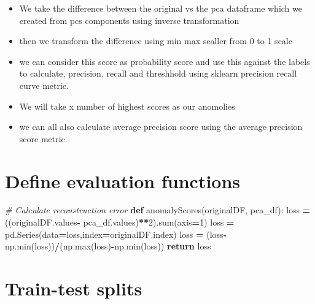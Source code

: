 \documentclass[
]{article}
\newenvironment{Shaded}{\begin{snugshade}}{\end{snugshade}}
\newcommand{\BuiltInTok}[1]{#1}
\newcommand{\CommentTok}[1]{\textcolor[rgb]{0.56,0.35,0.01}{\textit{#1}}}
\newcommand{\ControlFlowTok}[1]{\textcolor[rgb]{0.13,0.29,0.53}{\textbf{#1}}}
\newcommand{\DecValTok}[1]{\textcolor[rgb]{0.00,0.00,0.81}{#1}}
\newcommand{\KeywordTok}[1]{\textcolor[rgb]{0.13,0.29,0.53}{\textbf{#1}}}
\newcommand{\NormalTok}[1]{#1}
\newcommand{\OperatorTok}[1]{\textcolor[rgb]{0.81,0.36,0.00}{\textbf{#1}}}
\providecommand{\tightlist}{%
  \setlength{\itemsep}{0pt}\setlength{\parskip}{0pt}}
\begin{document}
\begin{itemize}
\tightlist
\item
  We take the difference between the original vs the pca dataframe which
  we created from pcs components using inverse transformation
\item
  then we transform the difference using min max scaller from 0 to 1
  scale
\item
  we can consider this score as probability score and use this against
  the labels to calculate, precision, recall and threshhold using
  sklearn precision recall curve metric.
\item
  We will take x number of highest scores as our anomolies
\item
  we can all also calculate average precision score using the average
  precision score metric.
\end{itemize}

\hypertarget{define-evaluation-functions}{%
\section{Define evaluation
functions}\label{define-evaluation-functions}}

\begin{Shaded}
\begin{Highlighting}[]
\CommentTok{\# Calculate reconstruction error}
\KeywordTok{def}\NormalTok{ anomalyScores(originalDF, pca\_df):}
\NormalTok{    loss }\OperatorTok{=}\NormalTok{ ((originalDF.values}\OperatorTok{{-}}\NormalTok{ pca\_df.values)}\OperatorTok{**}\DecValTok{2}\NormalTok{).}\BuiltInTok{sum}\NormalTok{(axis}\OperatorTok{=}\DecValTok{1}\NormalTok{)    }
\NormalTok{    loss }\OperatorTok{=}\NormalTok{ pd.Series(data}\OperatorTok{=}\NormalTok{loss,index}\OperatorTok{=}\NormalTok{originalDF.index)}
\NormalTok{    loss }\OperatorTok{=}\NormalTok{ (loss}\OperatorTok{{-}}\NormalTok{np.}\BuiltInTok{min}\NormalTok{(loss))}\OperatorTok{/}\NormalTok{(np.}\BuiltInTok{max}\NormalTok{(loss)}\OperatorTok{{-}}\NormalTok{np.}\BuiltInTok{min}\NormalTok{(loss))}
    \ControlFlowTok{return}\NormalTok{ loss}
\end{Highlighting}
\end{Shaded}

\hypertarget{train-test-splits}{%
\section{Train-test splits}\label{train-test-splits}}
\end{document}
